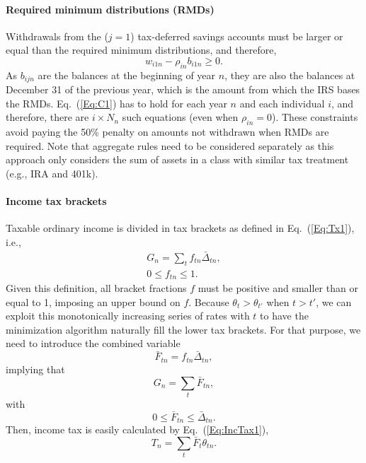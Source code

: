 \documentclass{report}[fleqn,12pt]
\begin{document}
\paragraph*{Required minimum distributions (RMDs)}
	Withdrawals from the ($j=1$) tax-deferred savings accounts must be larger
	or equal than the required minimum distributions, and therefore,
	\begin{equation}
		\label{Eq:C1}
		w_{i1n} -  \rho_{in}b_{i1n} \geq 0.
	\end{equation}
	As $b_{ijn}$ are the balances at the beginning of year $n$, they are also the balances
	at December 31 of the previous year, which is the amount from which the IRS bases the RMDs.
	Eq.~(\ref{Eq:C1}) has to hold for each year $n$ and each individual $i$, and therefore, there
	are $i\times N_n$ such equations (even when $\rho_{in} = 0$).
	These constraints avoid paying the 50\% penalty
	on amounts not withdrawn when RMDs are required.
	Note that aggregate rules need to be considered separately as this approach only considers
	the sum of assets in a class with similar tax treatment (e.g., IRA and 401k).

\paragraph*{Income tax brackets}
	Taxable ordinary income is divided in tax brackets as defined in Eq.~(\ref{Eq:Tx1}), i.e.,
	\begin{eqnarray}
		\label{Eq:C2}
		G_n = \sum_t f_{tn}\bar{\Delta}_{tn} ,\nonumber\\
		0 \leq f_{tn} \leq 1.
	\end{eqnarray}
	Given this definition, all bracket fractions $f$ must be positive and smaller than or equal to 1,
	imposing an upper bound on $f$.
	Because $\theta_{t} > \theta_{t'}$ when $t > t'$, we can exploit
	this monotonically increasing series of rates with $t$ to have the minimization
	algorithm naturally fill the lower tax brackets.
	For that purpose, we need to introduce the combined variable
	\begin{equation}
		\bar{F}_{tn} = f_{tn}\bar{\Delta}_{tn},
	\end{equation}
	implying that
	\begin{equation}
		G_n = \sum_t \bar{F}_{tn},
	\end{equation}
	with
	\begin{equation}
		0 \le \bar{F}_{tn} \le \bar{\Delta}_{tn}.
	\end{equation}
	Then, income tax is easily calculated by Eq.~(\ref{Eq:IncTax1}), 
	\begin{equation*}
		T_n = \sum_t \bar{F}_t \theta_{tn}.
	\end{equation*}
\end{document}
